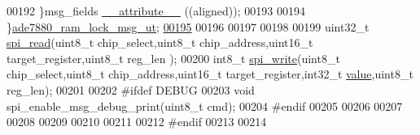 \begin{DoxyCode}
00192     \}msg\_fields  \hyperlink{a00041_a93c867902b57f5986f7dc397bd28f600}{\_\_attribute\_\_} ((aligned));
00193     
00194 \}\hyperlink{a00012}{ade7880\_ram\_lock\_msg\_ut};
\hypertarget{a00041_source_l00195}{}\hyperlink{a00041_a638e4503e0ae6ce655b7ad2e17e8f0ad}{00195} 
00196 
00197 
00198 
00199 uint32\_t \hyperlink{a00007_ga7ad9f65ee46aca507374096506a0b1c4}{spi\_read}(uint8\_t chip\_select,uint8\_t chip\_address,uint16\_t target\_register,uint8\_t reg\_len
      );
00200 int8\_t   \hyperlink{a00007_ga2770219ad8ad1eda1817c0df934b47d0}{spi\_write}(uint8\_t chip\_select,uint8\_t chip\_address,uint16\_t target\_register,int32\_t 
      \hyperlink{a00041_a638e4503e0ae6ce655b7ad2e17e8f0ad}{value},uint8\_t reg\_len);
00201 
00202 \textcolor{preprocessor}{#ifdef DEBUG}
00203 \textcolor{preprocessor}{}\textcolor{keywordtype}{void} spi\_enable\_msg\_debug\_print(uint8\_t cmd);
00204 \textcolor{preprocessor}{#endif}
00205 \textcolor{preprocessor}{}
00206 
00207 
00208 
00209 
00210 
00211 
00212 \textcolor{preprocessor}{#endif }
00213 \textcolor{preprocessor}{}
00214 
\end{DoxyCode}
